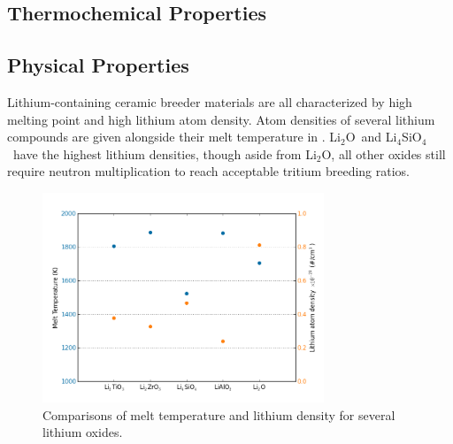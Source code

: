 \documentclass[11pt]{report} %
\newcommand{\lis}{Li$_4$SiO$_4$}
\newcommand{\lio}{Li$_2$O}
\newcommand{\lisix}{$^6\mathrm{Li}$}
\begin{document}





\subsection{Thermochemical Properties}


\subsection{Physical Properties}

Lithium-containing ceramic breeder materials are all characterized by high melting point and high lithium atom density. Atom densities of several lithium compounds are given alongside their melt temperature in . \lio~and \lis~have the highest lithium densities, though aside from \lio, all other oxides still require neutron multiplication to reach acceptable tritium breeding ratios. 

\begin{figure}[ht]
	\centering
	\includegraphics[width=0.75\textwidth]{images/tmelt-li-density} 
	\caption{Comparisons of melt temperature and lithium density for several lithium oxides.}
	\label{fig:tmelt-li-density}
\end{figure}
\end{document}
